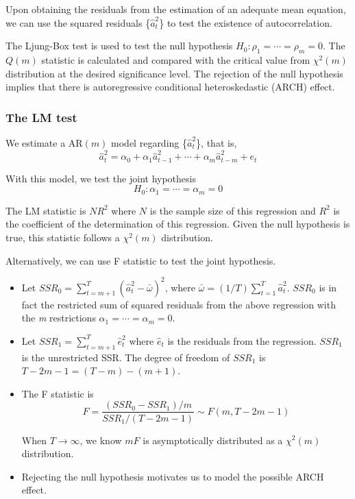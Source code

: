 \documentclass[a4paper,11pt]{article}
\begin{document}
Upon obtaining the residuals from the estimation
of an adequate mean equation, we can use the squared residuals
\{\(\hat{a}_t^2\)\} to test the existence of autocorrelation. 

The Ljung-Box test is used to test the null hypothesis
\(H_0: \rho_1 = \cdots = \rho_m = 0\). The \(Q(m)\) statistic is
calculated and compared with the critical value from \(\chi^2(m)\)
distribution at the desired significance level. The rejection of the
null hypothesis implies that there is autoregressive conditional
heteroskedastic (ARCH) effect. 

\subsubsection*{The LM test}
\label{sec:org18d7a39}

We estimate a AR\((m)\) model regarding \{\(\hat{a}^2_t\)\}, that is,
\[ \hat{a}^2_t = \alpha_0 + \alpha_1 \hat{a}_{t-1}^2 + \cdots +
\alpha_m \hat{a}^2_{t-m} + e_t \]

With this model, we test the joint hypothesis
\[H_0: \alpha_1 = \cdots = \alpha_m = 0 \]

The LM statistic is \(NR^2\) where \(N\) is the sample size of this
regression and \(R^2\) is the coefficient of the determination of this
regression. Given the null hypothesis is true, this statistic follows
a \(\chi^2(m)\) distribution. 

Alternatively, we can use F statistic to test the joint
hypothesis. 
\begin{itemize}
\item Let \(SSR_0 = \sum_{t=m+1}^{T} (\hat{a}^2_{t} -
  \bar{\omega})^2\), where \(\bar{\omega} = (1/T) \sum_{t=1}^T
  \hat{a}^2_t\). \(SSR_0\) is in fact the restricted sum of squared
residuals from the above regression with the \emph{m} restrictions
\(\alpha_1 = \cdots = \alpha_m = 0\).
\item Let \(SSR_1 = \sum_{t=m+1}^T \hat{e}^2_t\) where \(\hat{e}_t\) is the
residuals from the regression. \(SSR_1\) is the unrestricted SSR. The
degree of freedom of \(SSR_1\) is \(T-2m-1 = (T-m) - (m+1)\).
\item The F statistic is
\[F = \frac{(SSR_0 - SSR_1)/m}{SSR_1/(T-2m-1)} \sim F(m, T-2m-1)\]

When \(T \rightarrow \infty\), we know \(mF\) is asymptotically
distributed as a \(\chi^2(m)\) distribution.

\item Rejecting the null hypothesis motivates us to model the possible
ARCH effect.
\end{itemize}
\end{document}
